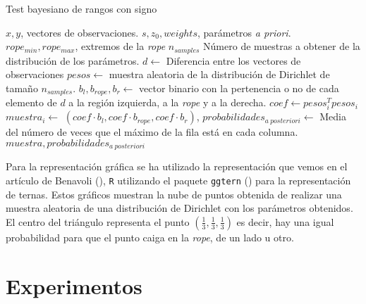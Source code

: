 \begin{algorithm}[H]
	\caption{Test bayesiano de rangos con signo}
	\label{alg:TBRS}
	\begin{algorithmic}[1]
	\REQUIRE $x, y$, vectores de observaciones.
	\REQUIRE $s, z_0, weights$, parámetros \textit{a priori}.
	\REQUIRE $rope_{min}, rope_{max}$, extremos de la \textit{rope}
	\REQUIRE $n_{samples}$ Número de muestras a obtener de
		la distribución de los parámetros.
	\STATE $d \leftarrow$ Diferencia entre los vectores 
		de observaciones 
	\STATE $pesos \leftarrow$ muestra aleatoria de 
		la distribución de Dirichlet de tamaño $n_{samples}$.
	\STATE $b_l, b_{rope}, b_r \leftarrow$ vector binario con
		la pertenencia o no de cada elemento de $d$ a la 
		región izquierda, a la \textit{rope} y a la derecha.
		\STATE $coef \leftarrow pesos_i^T pesos_i$
		\STATE $muestra_i \leftarrow$
			$(coef \cdot b_l, coef \cdot b_{rope}, 
			coef \cdot b_r)$,  
	\ENDFOR
	\STATE $probabilidades_{a\ posteriori} \leftarrow $
		Media del número de veces que el máximo de la fila 
		está en cada columna.
	\RETURN $muestra, probabilidades_{a\ posteriori}$
	\end{algorithmic}
\end{algorithm} 


Para la representación gráfica se ha utilizado
la representación que vemos en el artículo
de Benavoli (\cite{DBLP:journals/corr/BenavoliCDZ16}),
\texttt{R} utilizando el paquete \texttt{ggtern} (\cite{ggtern})
para la representación de ternas. Estos gráficos
muestran la nube de puntos obtenida de realizar
una muestra aleatoria de una distribución
de Dirichlet con los parámetros obtenidos.
El centro del triángulo representa el punto
$\left( \frac{1}{3}, \frac{1}{3}, \frac{1}{3} \right)$
es decir, hay una igual probabilidad para que el punto
caiga en la \textit{rope}, de un lado u otro. 



\chapter{Experimentos}
\label{chapter:experimentos}
